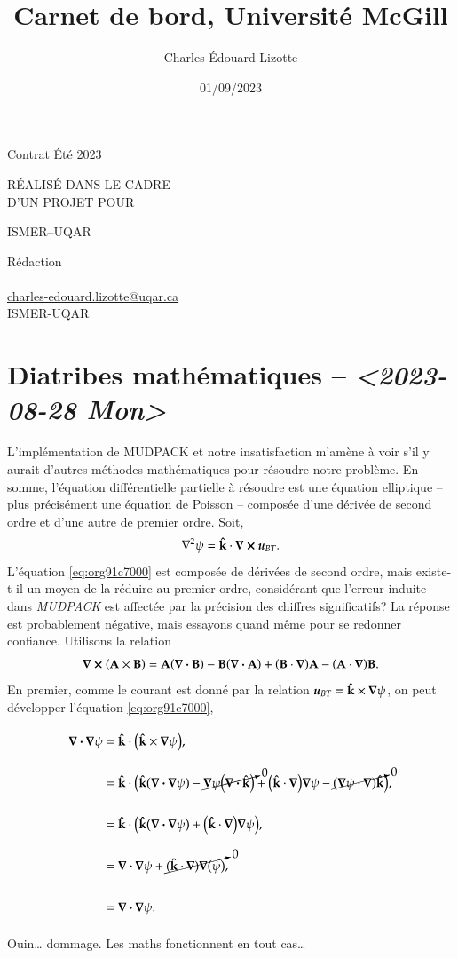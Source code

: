 \documentclass[10pt]{article}
\author{Charles-Édouard Lizotte}
\date{01/09/2023}
\title{Carnet de bord, Université McGill}
\makeatletter
\numberwithin{equation}{section}
\newcommand{\kvf}{\vb{\hat{k}}}
\newcommand{\uu}{\vb*{u}}
\newcommand{\venti}{\vphantom{\sum_x^x}}
\newcommand{\mytitlepage}{
\begin{titlepage}
\begin{center}
{\Large Contrat Été 2023 \par}
\vspace{2cm}
{\Large \MakeUppercase{\thetitle} \par}
\vspace{2cm}
RÉALISÉ DANS LE CADRE\\ D'UN PROJET POUR \par
\vspace{2cm}
{\Large ISMER--UQAR \par}
\vspace{2cm}
{\thedate}
\end{center}
\vfill
Rédaction \\
{\theauthor}\\
\url{charles-edouard.lizotte@uqar.ca}\\
ISMER-UQAR
\end{titlepage}
}
\makeatother
\begin{document}
\mytitlepage
\tableofcontents\newpage

\section{Diatribes mathématiques -- \textit{<2023-08-28 Mon>}}
\label{sec:org0fd395e}
L'implémentation de MUDPACK et notre insatisfaction m'amène à voir s'il y aurait d'autres méthodes mathématiques pour résoudre notre problème.
En somme, l'équation différentielle partielle à résoudre est une équation elliptique -- plus précisément une équation de Poisson -- composée d'une dérivée de second ordre et d'une autre de premier ordre.
Soit,
\begin{equation}
\label{eq:org91c7000}
   \laplacian{\psi} = \kvf \cdot \curl{\uu_{BT}}.
\end{equation}
L'équation \ref{eq:org91c7000} est composée de dérivées de second ordre, mais existe-t-il un moyen de la réduire au premier ordre, considérant que l'erreur induite dans \emph{MUDPACK} est affectée par la précision des chiffres significatifs?
La réponse est probablement négative, mais essayons quand même pour se redonner confiance.
Utilisons la relation
\begin{equation}
   \curl(\vb{A}\times\vb{B}) = \vb{A}\qty(\divergence{\vb{B}}) - \vb{B}\qty(\divergence{\vb{A}}) +\qty(\vb{B}\cdot\gradient)\vb{A} -\qty(\vb{A}\cdot\gradient)\vb{B}.
\end{equation}
En premier, comme le courant est donné par la relation \(\uu_{BT} = \kvf \times \gradient{\psi}\), on peut développer l'équation \ref{eq:org91c7000},
\begin{align}
   \div{\gradient{\psi}}
   \venti&= \kvf \cdot \qty(\kvf \times \gradient{\psi}),\nonumber \\
   \venti&= \kvf \cdot \big(\kvf\qty(\divergence{\gradient{\psi}}) - \cancelto{0}{\gradient{\psi}\qty(\divergence{\kvf})} + \qty(\kvf\cdot\gradient) \gradient{\psi} - \cancelto{0}{\qty(\gradient{\psi} \cdot\gradient)\kvf} \big),\nonumber\\
   \venti&= \kvf \cdot \qty(\kvf\qty(\divergence{\gradient{\psi}}) + \qty(\kvf\cdot\gradient) \gradient{\psi}),\nonumber\\
   \venti&= \divergence{\gradient{\psi}} + \cancelto{0}{(\kvf\cdot\gradient)\gradient(\psi)},\nonumber\\
   \venti&=\divergence{\gradient{\psi}}.
\end{align}
Ouin\ldots{} dommage. Les maths fonctionnent en tout cas\ldots{}
\end{document}
